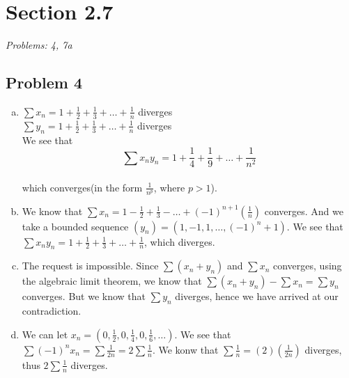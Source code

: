 \documentclass[12pt]{article}
\begin{document}
\section*{Section 2.7}
\textit{Problems: 4, 7a}
\subsection*{Problem 4}
\begin{enumerate}[a).]
    \item {
        $\sum x_n = 1 + \frac{1}{2} + \frac{1}{3} + \dots + \frac{1}{n}$ diverges\\
        $\sum y_n = 1 + \frac{1}{2} + \frac{1}{3} + \dots + \frac{1}{n}$ diverges\\
        We see that 
        $$\sum x_ny_n = 1 + \frac{1}{4} + \frac{1}{9} + \dots + \frac{1}{n^2}$$\\
        which converges(in the form $\frac{1}{n^p}$, where $p > 1$).
    }
    \item {
        We know that $\sum x_n = 1 - \frac{1}{2} + \frac{1}{3} - \dots + (-1)^{n+1}(\frac{1}{n})$ converges.
        And we take a bounded sequence $(y_n) = (1, -1, 1, \dots, (-1)^n+1)$. 
        We see that $\sum x_ny_n = 1 + \frac{1}{2} + \frac{1}{3} + \dots + \frac{1}{n}$, which diverges.

    }
    \item {
        The request is impossible.
        Since $\sum (x_n + y_n)$ and $\sum x_n$ converges, using the algebraic limit theorem, we know that $\sum(x_n + y_n) - \sum x_n = \sum y_n$ converges.
        But we know that $\sum y_n$ diverges, hence we have arrived at our contradiction.
    }
    \item {
        We can let $x_n = (0, \frac{1}{2}, 0, \frac{1}{4}, 0, \frac{1}{6}, \dots)$. 
        We see that $\sum (-1)^n x_n = \sum \frac{1}{2n} = 2 \sum \frac{1}{n}$. 
        We konw that $\sum \frac{1}{n} = (2)(\frac{1}{2n})$ diverges, thus $2 \sum \frac{1}{n}$ diverges.
    }
\end{enumerate}
\end{document}
